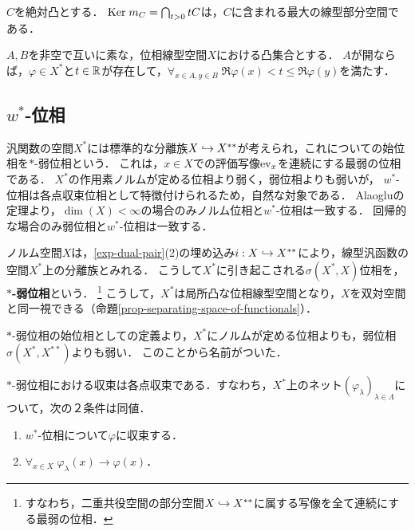\documentclass[uplatex,dvipdfmx]{jsreport}
\begin{document}
\begin{lemma}
    $C$を絶対凸とする．
    $\mathrm{Ker}\; m_C=\bigcap_{t>0}tC$は，$C$に含まれる最大の線型部分空間である．
\end{lemma}

\begin{theorem}\label{thm-Hahn-Banach-separation-theorem}
    $A,B$を非空で互いに素な，位相線型空間$X$における凸集合とする．
    $A$が開ならば，$\varphi\in X^*$と$t\in\mathbb{R}$が存在して，$\forall_{x\in A,y\in B}\;\Re\varphi(x)<t\le\Re\varphi(y)$を満たす．
\end{theorem}

\subsection{$w^*$-位相}

\begin{tcolorbox}[colframe=ForestGreen, colback=ForestGreen!10!white,breakable,colbacktitle=ForestGreen!40!white,coltitle=black,fonttitle=\bfseries\sffamily,
title=]
    汎関数の空間$X^*$には標準的な分離族$X\hookrightarrow X^{**}$が考えられ，これについての始位相を$*$-弱位相という．
    これは，$x\in X$での評価写像$\mathrm{ev}_x$を連続にする最弱の位相である．
    $X^*$の作用素ノルムが定める位相より弱く，弱位相よりも弱いが，
    $w^*$-位相は各点収束位相として特徴付けられるため，自然な対象である．
    Alaogluの定理より，$\dim(X)<\infty$の場合のみノルム位相と$w^*$-位相は一致する．
    回帰的な場合のみ弱位相と$w^*$-位相は一致する．
\end{tcolorbox}

\begin{definition}\label{def-weak-star-topology}
    ノルム空間$X$は，\ref{exp-dual-pair}(2)の埋め込み$i:X\hookrightarrow X^{**}$により，線型汎函数の空間$X^*$上の分離族とみれる．
    こうして$X^*$に引き起こされる$\sigma(X^*,X)$位相を，\textbf{$*$-弱位相}という．
    \footnote{すなわち，二重共役空間の部分空間$X\hookrightarrow X^{**}$に属する写像を全て連続にする最弱の位相．}
    こうして，$X^*$は局所凸な位相線型空間となり，$X$を双対空間と同一視できる（命題\ref{prop-separating-space-of-functionals}）．
\end{definition}
\begin{remarks}
    $*$-弱位相の始位相としての定義より，$X^*$にノルムが定める位相よりも，弱位相$\sigma(X^*,X^{**})$よりも弱い．
    このことから名前がついた．
\end{remarks}

\begin{lemma}[$*$-弱収束は各点収束]\label{lemma-characterization-of-convergence-in-w*topology}
    $*$-弱位相における収束は各点収束である．すなわち，$X^*$上のネット$(\varphi_\lambda)_{\lambda\in\Lambda}$について，次の２条件は同値．
    \begin{enumerate}
        \item $w^*$-位相について$\varphi$に収束する．
        \item $\forall_{x\in X}\;\varphi_\lambda(x)\to\varphi(x)$．
    \end{enumerate}
\end{lemma}
\end{document}
